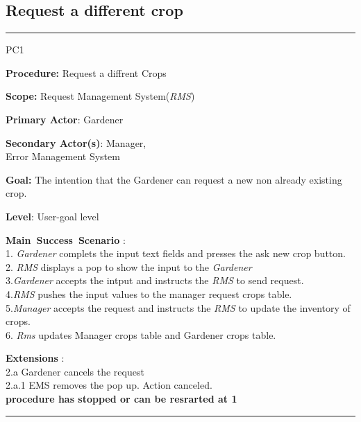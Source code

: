 \subsection{Request a different crop}
\vspace{0.5cm}
\hrule
\hfill
\begin{lyxlist}{PC1}
\small{
\item [\textbf{Procedure:}] Request a diffrent Crops
\item [\textbf{Scope:}] Request Management System(\emph{RMS})
\item [\textbf{Primary Actor}:] Gardener
\item [\textbf{Secondary Actor(s)}:] Manager,\\
Error Management System
\item [\textbf{Goal:}] The intention that the Gardener can request a new
non already existing crop.
\item [\textbf{Level}:] User-goal level
\item [\textbf{Main~Success~Scenario}]:\\
1. \emph{Gardener} complets the input text fields and presses the ask new crop
button.
2. \emph{RMS} displays a pop to show the input to the \emph{Gardener}\\
3.\emph{Gardener} accepts the intput and instructs the \emph{RMS} to send
request.\\
4.\emph{RMS} pushes the input values to the manager request crops table.\\
5.\emph{Manager} accepts the request and instructs the \emph{RMS} to update the
inventory of crops.\\
6. \emph{Rms} updates Manager crops table and Gardener crops table.\\
\item [\textbf{Extensions}]:\\
2.a Gardener cancels the request\\
\hspace*{0.5cm} 2.a.1 {EMS} removes the pop up. Action canceled.\\
\hspace*{0.5cm} \textbf{procedure has stopped or can be resrarted at 1}
}
\end{lyxlist}
\hrule
\vspace{0.5cm}


\break


